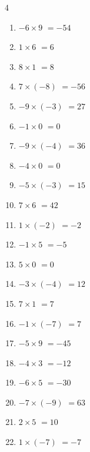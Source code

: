 \begin{multicols}{4}
\begin{enumerate}
  \item $-6\times 9$
        $=-54$

  \item $1\times 6$
        $=6$

  \item $8\times 1$
        $=8$

  \item $7\times (-8)$
        $=-56$

  \item $-9\times (-3)$
        $=27$

  \item $-1\times 0$
        $=0$

\columnbreak %

  \item $-9\times (-4)$
        $=36$

  \item $-4\times 0$
        $=0$

  \item $-5\times (-3)$
        $=15$

  \item $7\times 6$
        $=42$

  \item $1\times (-2)$
        $=-2$

  \item $-1\times 5$
        $=-5$

  \item $5\times 0$
        $=0$

  \item $-3\times (-4)$
        $=12$

  \item $7\times 1$
        $=7$

  \item $-1\times (-7)$
        $=7$

  \item $-5\times 9$
        $=-45$

  \item $-4\times 3$
        $=-12$

  \item $-6\times 5$
        $=-30$

  \item $-7\times (-9)$
        $=63$

  \item $2\times 5$
        $=10$

  \item $1\times (-7)$
        $=-7$


\end{enumerate}
\end{multicols}
